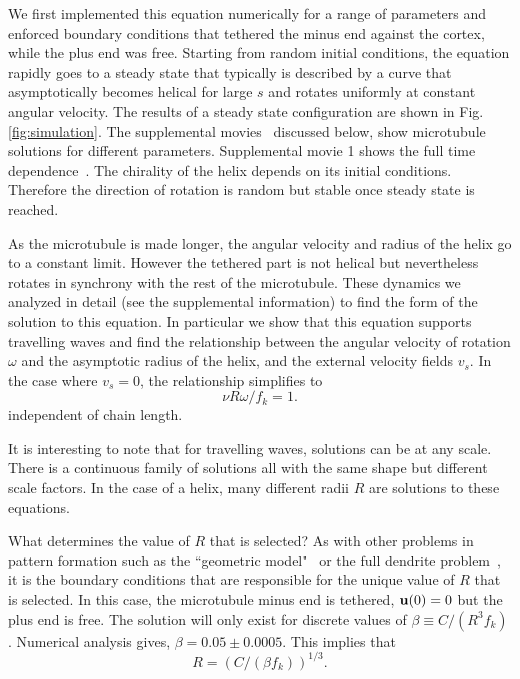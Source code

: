 \documentclass[pre,showpacs]{revtex4}
\def\bu{{\bf u}}
\begin{document}
We first implemented this equation numerically for a range of parameters
and enforced boundary conditions that tethered the minus end against the cortex, while
the plus end was free. Starting from random initial conditions, the equation rapidly goes to a steady state that
typically is described by a curve that asymptotically becomes helical for large $s$ and rotates uniformly at constant
angular velocity. The results of a steady state configuration are shown in Fig. \ref{fig:simulation}. 
The supplemental movies~\cite{SupplMovies} discussed below, show microtubule solutions for different
parameters.
Supplemental movie 1 shows the full time dependence~\cite{SupplMovies}. The chirality of the helix depends on its initial conditions.
Therefore the direction of rotation is random but stable once steady state is reached.

As the microtubule is made longer, the angular velocity and radius of the helix go to
a constant limit. However the tethered part is not helical but nevertheless rotates
in synchrony with the rest of the microtubule. These dynamics we analyzed in detail
(see the supplemental information) to find the form of the solution to this equation.
In particular we show that this equation supports travelling waves and find the
relationship between the angular velocity of rotation $\omega$ and the asymptotic
radius of the helix, and the external velocity fields $v_s$. In the case where $v_s = 0$, the
relationship simplifies to 
\begin{equation}
\label{eq:Romega}
\nu R \omega/f_k = 1.
\end{equation}
independent of chain length.

It is interesting to note that for travelling waves, solutions can be at any scale. There is a continuous family of solutions
all with the same shape but different scale factors. In the case of a helix, many different radii $R$ are solutions to
these equations.

What determines the value of $R$ that is selected? As with other problems in pattern formation such as the ``geometric model"~\cite{Kessler}
or the full dendrite problem~\cite{Barbieri}, it is the boundary conditions
that are responsible for the unique value of $R$ that is selected. In this case, the microtubule minus end is tethered, $\bu(0) = 0$
but the plus end is free.
The solution will only exist for discrete values
of $\beta \equiv C/(R^3 f_k)$. Numerical analysis gives, $\beta = 0.05 \pm 0.0005$. 
This implies that 
\begin{equation}
\label{eq:R}
R =  (C/(\beta f_k))^{1/3}.
\end{equation}
\end{document}
